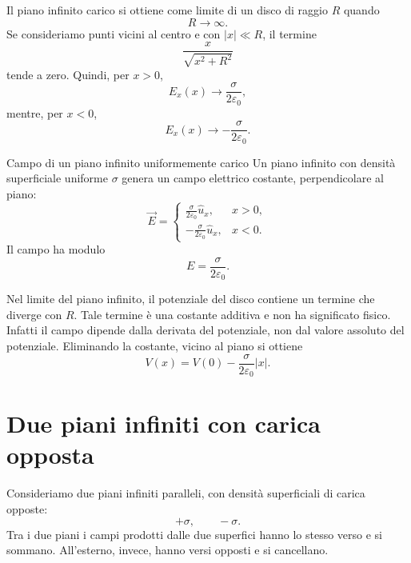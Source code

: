 \documentclass[a4paper]{article}
\begin{document}
Il piano infinito carico si ottiene come limite di un disco di raggio \(R\) quando
\[
    R\to\infty.
\]
Se consideriamo punti vicini al centro e con \(|x|\ll R\), il termine
\[
    \frac{x}{\sqrt{x^2+R^2}}
\]
tende a zero. Quindi, per \(x>0\),
\[
    E_x(x)\to \frac{\sigma}{2\varepsilon_0},
\]
mentre, per \(x<0\),
\[
    E_x(x)\to -\frac{\sigma}{2\varepsilon_0}.
\]

\begin{snippettheorem}{Campo di un piano infinito uniformemente carico}
    Un piano infinito con densità superficiale uniforme \(\sigma\) genera un campo elettrico costante, perpendicolare al piano:
    \[
        \vec{E}=
        \begin{cases}
            \displaystyle \frac{\sigma}{2\varepsilon_0}\hat{u}_x, & x>0,\\[6pt]
            \displaystyle -\frac{\sigma}{2\varepsilon_0}\hat{u}_x, & x<0.
        \end{cases}
    \]
    Il campo ha modulo
    \[
        E=\frac{\sigma}{2\varepsilon_0}.
    \]
\end{snippettheorem}

Nel limite del piano infinito, il potenziale del disco contiene un termine che diverge con \(R\). Tale termine è una costante additiva e non ha significato fisico. Infatti il campo dipende dalla derivata del potenziale, non dal valore assoluto del potenziale. Eliminando la costante, vicino al piano si ottiene
\[
    V(x)=V(0)-\frac{\sigma}{2\varepsilon_0}|x|.
\]

\begin{center}
\end{center}

\section{Due piani infiniti con carica opposta}

Consideriamo due piani infiniti paralleli, con densità superficiali di carica opposte:
\[
    +\sigma,
    \qquad
    -\sigma.
\]
Tra i due piani i campi prodotti dalle due superfici hanno lo stesso verso e si sommano. All'esterno, invece, hanno versi opposti e si cancellano.
\end{document}
